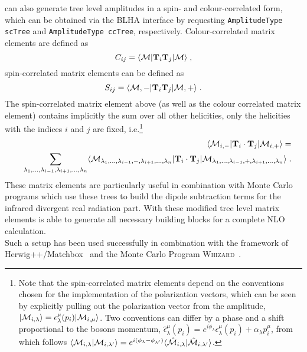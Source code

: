 \gosam{} can also generate  tree level amplitudes in a spin- and colour-correlated form, which can be obtained via the BLHA interface by requesting \texttt{AmplitudeType scTree} and \texttt{AmplitudeType ccTree}, respectively. Colour-correlated matrix elements are defined as
\begin{equation}
 C_{ij}=\langle{{\cal M}}|\textbf{T}_{i}\textbf{T}_j |{{\cal M}}\rangle\;,
\end{equation}
spin-correlated matrix elements can be defined as
\begin{equation}
 S_{ij}=\langle{{\cal M},-}|\textbf{T}_{i}\textbf{T}_j |{{\cal M},+}\rangle\;.
\end{equation}
The spin-correlated matrix element above (as well as the colour correlated matrix element) contains implicitly
the sum over all other helicities, only the helicities with the indices $i$ and $j$ are fixed, i.e.\footnote{Note that the spin-correlated matrix elements depend on the conventions chosen for the implementation of the polarization vectors, which can be seen by explicitly pulling out the polarization vector from the amplitude, $|{\cal M}_{i,\lambda}\rangle=\epsilon_\lambda^\mu(p_i)|{\cal M}_{i,\mu}\rangle$. Two conventions can differ by a phase and a shift proportional to the bosons momentum, $\hat{\epsilon}_\lambda^{\mu}(p_i)=e^{i\phi_\lambda}\epsilon_\lambda^\mu(p_i)+\alpha_\lambda p_i^\mu$, from which follows $\langle{\cal M}_{i,\lambda}|{\cal M}_{i,\lambda'}\rangle=e^{i(\phi_{\lambda}-\phi_{\lambda'})}\langle\hat{{\cal M}}_{i,\lambda}|\hat{{\cal M}}_{i,\lambda'}\rangle$.}
 \begin{eqnarray}
&&\langle {\cal M}_{i,-} |{\mathbf T}_i\cdot {\mathbf T}_j |{\cal M}_{i,+}\rangle =\\
&&\sum_{\lambda_1,...,\lambda_{i-1},\lambda_{i+1},...,\lambda_n}
\langle {\cal M}_{\lambda_1,...,\lambda_{i-1},-,\lambda_{i+1},...,\lambda_n} |
{\mathbf T}_i\cdot {\mathbf T}_j | 
{\cal M}_{\lambda_1,...,\lambda_{i-1},+,\lambda_{i+1},...,\lambda_n}\rangle \;. \nonumber
\end{eqnarray}
These matrix elements are particularly useful in combination with Monte Carlo programs 
which use these trees to build the dipole subtraction terms for the infrared divergent 
real radiation part. With these modified tree level matrix elements \gosam{} is able to generate
all necessary building blocks for a complete NLO calculation.\\
Such a setup has been used successfully in combination with the framework of 
{\sc Herwig++/Matchbox}~\cite{LesHouches2013,Bellm:2013lba,Platzer:2011bc} and the Monte Carlo Program \textsc{Whizard}~\cite{Kilian:2007gr,Moretti:2001zz,Stienemeier:2021cse,Braun:2025hvr}.

